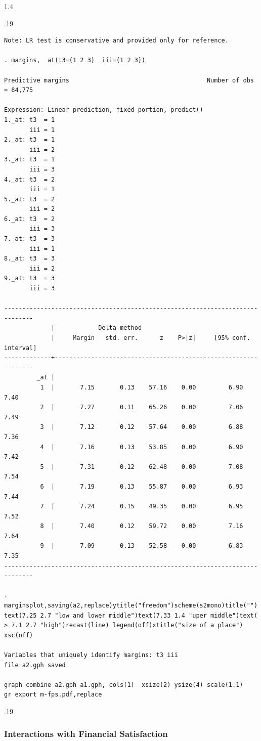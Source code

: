\documentclass[10pt, letterpaper]{article}
\begin{document}
\begin{spacing}{1.4}
\begin{scriptsize}
\begin{spacing}{.19}
\begin{verbatim}
Note: LR test is conservative and provided only for reference.

. margins,  at(t3=(1 2 3)  iii=(1 2 3))

Predictive margins                                      Number of obs = 84,775

Expression: Linear prediction, fixed portion, predict()
1._at: t3  = 1
       iii = 1
2._at: t3  = 1
       iii = 2
3._at: t3  = 1
       iii = 3
4._at: t3  = 2
       iii = 1
5._at: t3  = 2
       iii = 2
6._at: t3  = 2
       iii = 3
7._at: t3  = 3
       iii = 1
8._at: t3  = 3
       iii = 2
9._at: t3  = 3
       iii = 3

------------------------------------------------------------------------------
             |            Delta-method
             |     Margin   std. err.      z    P>|z|     [95% conf. interval]
-------------+----------------------------------------------------------------
         _at |
          1  |       7.15       0.13    57.16    0.00         6.90        7.40
          2  |       7.27       0.11    65.26    0.00         7.06        7.49
          3  |       7.12       0.12    57.64    0.00         6.88        7.36
          4  |       7.16       0.13    53.85    0.00         6.90        7.42
          5  |       7.31       0.12    62.48    0.00         7.08        7.54
          6  |       7.19       0.13    55.87    0.00         6.93        7.44
          7  |       7.24       0.15    49.35    0.00         6.95        7.52
          8  |       7.40       0.12    59.72    0.00         7.16        7.64
          9  |       7.09       0.13    52.58    0.00         6.83        7.35
------------------------------------------------------------------------------

. marginsplot,saving(a2,replace)ytitle("freedom")scheme(s2mono)title("") text(7.25 2.7 "low and lower middle")text(7.33 1.4 "uper middle")text(
> 7.1 2.7 "high")recast(line) legend(off)xtitle("size of a place") xsc(off)

Variables that uniquely identify margins: t3 iii
file a2.gph saved

graph combine a2.gph a1.gph, cols(1)  xsize(2) ysize(4) scale(1.1)
gr export m-fps.pdf,replace
\end{verbatim}
\end{spacing}{.19}
\end{scriptsize}


\subsubsection{Interactions with Financial Satisfaction}




\end{spacing}
\end{document}
